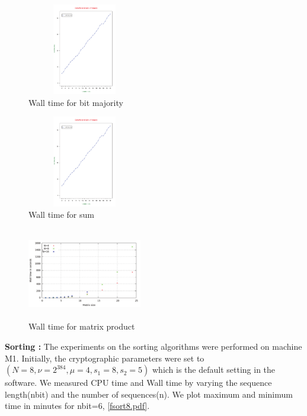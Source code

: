 \documentclass{acm_proc_article-sp}
\begin{document}
\begin{figure}%
\centering
\includegraphics[width=5cm, height=4cm]{f8.pdf} 
\caption{Wall time for bit majority} 
\label{fig:image_sf0bis} %
\end{figure}
\begin{figure}%
\centering
\includegraphics[width=5cm, height=4cm]{f8.pdf} 
\caption{Wall time for sum} 
\label{fig:image_sf1} %
\end{figure}

\begin{figure}%
\centering
\includegraphics[width=5cm, height=4cm]{f9.pdf} 
\caption{Wall time for matrix product} 
\label{fig:image_sf2} %
\end{figure}

 \textbf{Sorting :} 
The experiments on the sorting algorithms were performed on machine M1. 
Initially, the cryptographic parameters were set to $(N = 8, \nu = 2^{384}, \mu = 4, s_1 = 8, s_2 = 5)$ which is the default setting in the software. We measured CPU time and Wall time by varying the sequence length(nbit) and the number of sequences(n). We plot maximum and minimum time in minutes for nbit=6, \autoref{fsort8.pdf}.   
\end{document}
